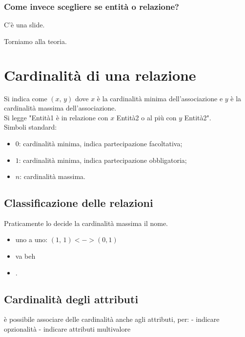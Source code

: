 \subsubsection{Come invece scegliere se entità o relazione?}
C'è una slide.

Torniamo alla teoria.
\section{Cardinalità di una relazione}
Si indica come $(x,\, y)$ dove $x$ è la cardinalità minima dell'associazione e $y$ è la cardinalità massima dell'associazione.
\\Si legge "Entità1 è in relazione con $x$ Entità2 o al più con $y$ Entità2".
\\Simboli standard:
\begin{itemize}
    \item $0$: cardinalità minima, indica partecipazione facoltativa;
    \item $1$: cardinalità minima, indica partecipazione obbligatoria;
    \item $n$: cardinalità massima.
\end{itemize}

\subsection{Classificazione delle relazioni}
Praticamente lo decide la cardinalità massima il nome.
\begin{itemize}
    \item uno a uno: $(1,\, 1) <-> (0,1)$
    \item va beh
    \item .
\end{itemize}

\subsection{Cardinalità degli attributi}
è possibile associare delle cardinalità anche agli attributi, per:
- indicare opzionalità
- indicare attributi multivalore



